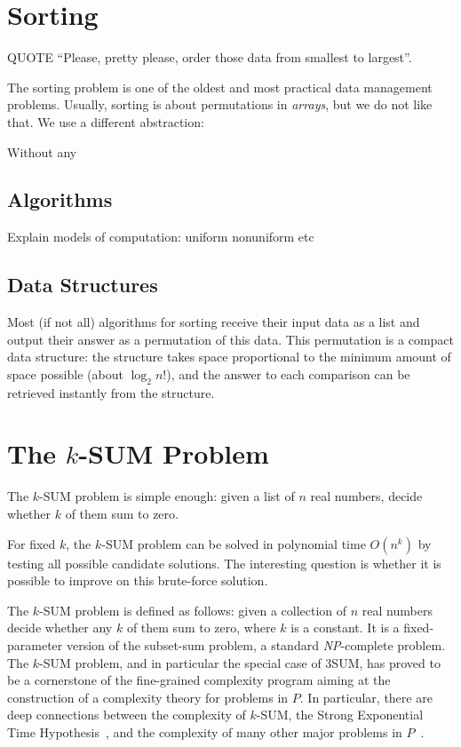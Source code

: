 \section{Sorting}

QUOTE ``Please, pretty please, order those data from smallest to largest''.

The sorting problem is one of the oldest and most practical data management
problems.
%
Usually, sorting is about permutations in \emph{arrays}, but we do not like
that. We use a different abstraction:



Without any

\subsection{Algorithms}
Explain models of computation: uniform nonuniform etc

\subsection{Data Structures}

Most (if not all) algorithms for sorting receive their input data as a list and
output their answer as a permutation of this data. This permutation is a
compact data structure: the structure takes space proportional to the minimum
amount of space possible (about \(\log_2 n!\)), and the answer to each
comparison can be retrieved instantly from the structure.


\section{The \(k\)-SUM Problem}

The \(k\)-SUM problem is simple enough: given a list of \(n\) real numbers,
decide whether \(k\) of them sum to zero.



For fixed \(k\), the \(k\)-SUM problem can be solved in polynomial time
\(O(n^k)\) by testing all possible candidate solutions.
The interesting question is whether it is possible to improve on
this brute-force solution.

The \(k\)-SUM problem is defined as follows: given a collection of $n$ real
numbers decide whether any $k$ of them sum to zero, where $k$ is a constant.
It is a fixed-parameter version of the subset-sum problem, a standard \textit{NP}-complete
problem. The \(k\)-SUM problem, and in particular the special case of 3SUM,
has proved to be a cornerstone of the fine-grained complexity program aiming at
the construction of a complexity theory for problems in $P$. In particular,
there are deep connections between the complexity of \(k\)-SUM, the Strong
Exponential Time Hypothesis~\cite{PW10,CGIMPS15}, and the complexity of many
other major problems in
$P$~\cite{GO95,BH99,MO01,P10,ACLL14,AVW14,GP18,KPP14,ALW14,AWY15,CL15}.

